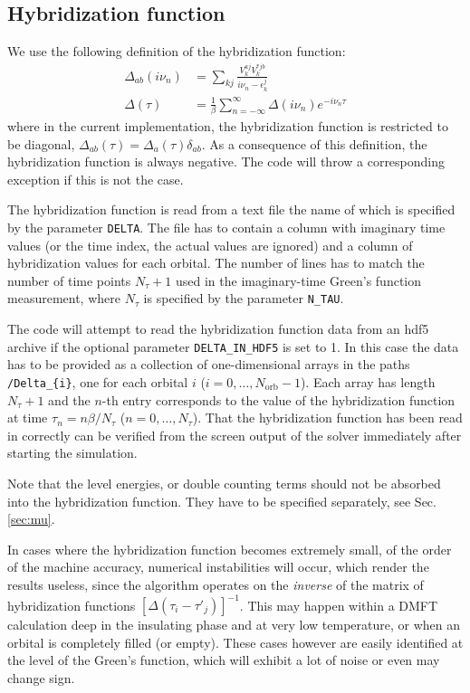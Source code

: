 \documentclass[aps,prb,floatfix,superscriptaddress,twocolumn,notitlepage]{revtex4-1}
\newcommand{\iom}{{\ensuremath{i\nu}}}
\begin{document}
\subsection{Hybridization function}
\label{hybridization}
We use the following definition of the hybridization function:
\begin{align}
\Delta_{ab}(\iom_{n}) &= \sum_{kj}\frac{V_{k}^{aj}V_{k}^{*jb}}{\iom_{n}-\epsilon_{k}^{j}}\\
\Delta(\tau) &= \frac{1}{\beta}\sum_{n=-\infty}^{\infty}\Delta(\iom_{n})e^{-\iom_{n}\tau}
\end{align}
where in the current implementation, the hybridization function is restricted to be diagonal, $\Delta_{ab}(\tau)=\Delta_{a}(\tau)\delta_{ab}$.
As a consequence of this definition, the hybridization function is always negative. The code will throw a corresponding exception if this is not the case.

The hybridization function is read from a text file the name of which is specified by the parameter \verb#DELTA#. The file has to contain a column with imaginary time values (or the time index, the actual values are ignored) and a column of hybridization values for each orbital. The number of lines has to match the number of time points $N_{\tau}+1$ used in the imaginary-time Green's function measurement, where $N_{\tau}$ is specified by the parameter \verb#N_TAU#.

The code will attempt to read the hybridization function data from an hdf5 archive if the optional parameter \verb#DELTA_IN_HDF5# is set to 1. In this case the data has to be provided as a collection of one-dimensional arrays in the paths \verb#/Delta_{i}#, one for each orbital $i$ ($i=0,\ldots,N_{\text{orb}}-1$). Each array has length $N_{\tau}+1$ and the $n$-th entry corresponds to the value of the hybridization function at time $\tau_{n}=n\beta/N_{\tau}$ ($n=0,\ldots,N_{\tau}$).
That the hybridization function has been read in correctly can be verified from the screen output of the solver immediately after starting the simulation.

Note that the level energies, or double counting terms should not be absorbed into the hybridization function. They have to be specified separately, see Sec. \ref{sec:mu}.

In cases where the hybridization function becomes extremely small, of the order of the machine accuracy, numerical instabilities will occur, which render the results useless, since the algorithm operates on the \emph{inverse} of the matrix of hybridization functions $[\Delta(\tau_{i}-\tau'_{j})]^{-1}$.
This may happen within a DMFT calculation deep in the insulating phase and at very low temperature, or when an orbital is completely filled (or empty).
These cases however are easily identified at the level of the Green's function, which will exhibit a lot of noise or even may change sign.
\end{document}
